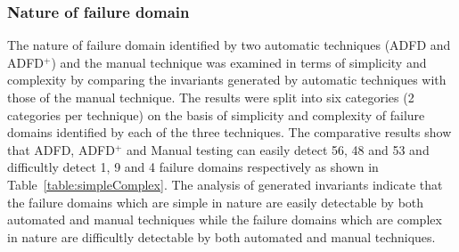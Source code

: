 \documentclass[runningheads,a4paper]{llncs}
\begin{document}





\subsubsection{Nature of failure domain} \label{sec:nature}
The nature of failure domain identified by two automatic techniques (ADFD and ADFD$^+$) and the manual technique was examined in terms of simplicity and complexity by comparing the invariants generated by automatic techniques with those of the manual technique. The results were split into six categories (2 categories per technique) on the basis of simplicity and complexity of failure domains identified by each of the three techniques. The comparative results show that ADFD, ADFD$^+$ and Manual testing can easily detect 56, 48 and 53 and difficultly detect 1, 9 and 4 failure domains respectively as shown in Table~\ref{table:simpleComplex}. The analysis of generated invariants indicate that the failure domains which are simple in nature are easily detectable by both automated and manual techniques while the failure domains which are complex in nature are difficultly detectable by both automated and manual techniques. %
\end{document}
